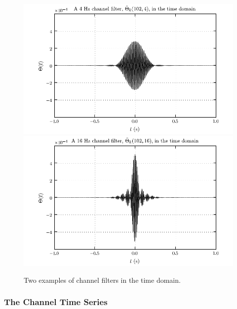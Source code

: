 \documentclass{article}
\begin{document}
\begin{figure}
\begin{center}
\includegraphics{figures/timedomainfilter_04hz.pdf}
\includegraphics{figures/timedomainfilter_16hz.pdf}
\end{center}
\caption{Two examples of channel filters in the time domain.}
\label{fig:timedomainfilter}
\end{figure}


\subsubsection{The Channel Time Series}
\end{document}

